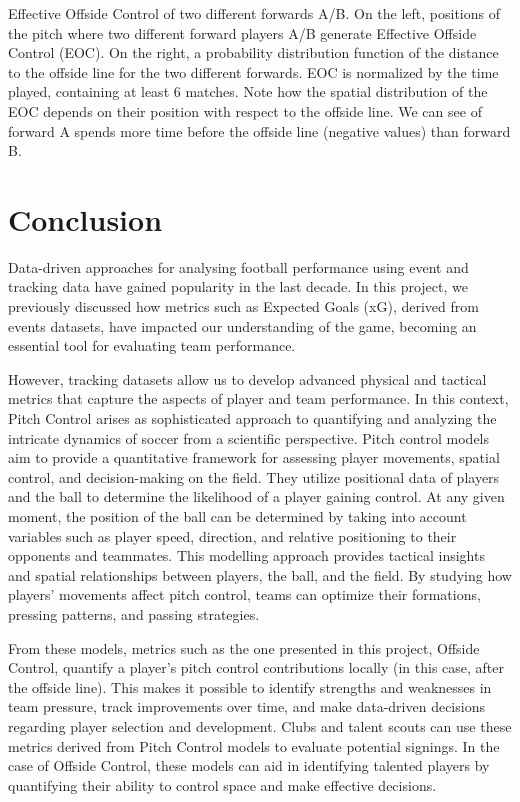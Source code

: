 \documentclass[twoside,nohyper]{tufte-book}
\begin{document}
Effective Offside Control of two different forwards A/B. On
the left, positions of the pitch where two different forward players A/B
generate Effective Offside Control (EOC). On the right, a probability
distribution function of the distance to the offside line for the two
different forwards. EOC is normalized by the time played, containing at
least 6 matches. Note how the spatial distribution of the EOC depends on
their position with respect to the offside line. We can see of forward A
spends more time before the offside line (negative values) than forward
B.

\hypertarget{conclusion}{%
\chapter{Conclusion}\label{conclusion}}

Data-driven approaches for analysing football performance using event
and tracking data have gained popularity in the last decade. In this
project, we previously discussed how metrics such as Expected Goals
(xG), derived from events datasets, have impacted our understanding of
the game, becoming an essential tool for evaluating team performance.

However, tracking datasets allow us to develop advanced physical and
tactical metrics that capture the aspects of player and team
performance. In this context, Pitch Control arises as sophisticated
approach to quantifying and analyzing the intricate dynamics of soccer
from a scientific perspective. Pitch control models aim to provide a
quantitative framework for assessing player movements, spatial control,
and decision-making on the field. They utilize positional data of
players and the ball to determine the likelihood of a player gaining
control. At any given moment, the position of the ball can be determined
by taking into account variables such as player speed, direction, and
relative positioning to their opponents and teammates. This modelling
approach provides tactical insights and spatial relationships between
players, the ball, and the field. By studying how players' movements
affect pitch control, teams can optimize their formations, pressing
patterns, and passing strategies.

From these models, metrics such as the one presented in this project,
Offside Control, quantify a player's pitch control contributions locally
(in this case, after the offside line). This makes it possible to
identify strengths and weaknesses in team pressure, track improvements
over time, and make data-driven decisions regarding player selection and
development. Clubs and talent scouts can use these metrics derived from
Pitch Control models to evaluate potential signings. In the case of
Offside Control, these models can aid in identifying talented players by
quantifying their ability to control space and make effective decisions.
\end{document}
